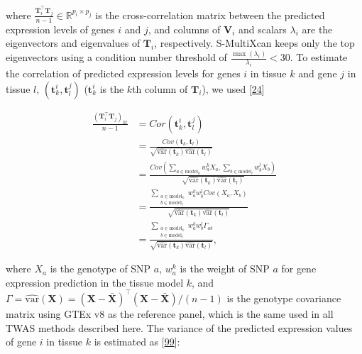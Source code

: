 \documentclass[
  legalpaperpaper,
]{article}
\begin{document}
where \(\frac{\mathbf{T}_{i}^{\top} \mathbf{T}_{j}}{n-1} \in \mathbb{R}^{p_i \times p_j}\) is the cross-correlation matrix between the predicted expression levels of genes \(i\) and \(j\),
and columns of \(\mathbf{V}_{i}\) and scalars \(\lambda_i\) are the eigenvectors and eigenvalues of \(\mathbf{T}_{i}\), respectively.
S-MultiXcan keeps only the top eigenvectors using a condition number threshold of \(\frac{\max(\lambda_i)}{\lambda_i} < 30\).
To estimate the correlation of predicted expression levels for genes \(i\) in tissue \(k\) and gene \(j\) in tissue \(l\), \((\mathbf{t}_k^i, \mathbf{t}_l^j)\) (\(\mathbf{t}_k^i\) is the \(k\)th column of \(\mathbf{T}_{i}\)), we used {[}\protect\hyperlink{ref-1FFzCXo1s}{24}{]}

\begin{equation}
\begin{split}
\frac{(\mathbf{T}_{i}^{\top} \mathbf{T}_{j})_{kl}}{n-1} & = Cor(\mathbf{t}_k^i, \mathbf{t}_l^j) \\
  & = \frac{ Cov(\mathbf{t}_k, \mathbf{t}_l) } { \sqrt{\widehat{\mathrm{var}}(\mathbf{t}_k) \widehat{\mathrm{var}}(\mathbf{t}_l)} } \\
  & = \frac{ Cov(\sum_{a \in \mathrm{model}_k} w_a^k X_a, \sum_{b \in \mathrm{model}_l} w_b^l X_b) }  {\sqrt{\widehat{\mathrm{var}}(\mathbf{t}_k) \widehat{\mathrm{var}}(\mathbf{t}_l)} } \\
  & = \frac{ \sum_{\substack{a \in \mathrm{model}_k \\ b \in \mathrm{model}_l}} w_a^k w_b^l Cov(X_a, X_b)} {\sqrt{\widehat{\mathrm{var}}(\mathbf{t}_k) \widehat{\mathrm{var}}(\mathbf{t}_l)} } \\
  & = \frac{ \sum_{\substack{a \in \mathrm{model}_k \\ b \in \mathrm{model}_l}} w_a^k w_b^l \Gamma_{ab}} {\sqrt{\widehat{\mathrm{var}}(\mathbf{t}_k) \widehat{\mathrm{var}}(\mathbf{t}_l)} },
\end{split}
\label{eq:reg:corr_genes}\end{equation}

where \(X_a\) is the genotype of SNP \(a\),
\(w_a^k\) is the weight of SNP \(a\) for gene expression prediction in the tissue model \(k\),
and \(\Gamma = \widehat{\mathrm{var}}(\mathbf{X}) = (\mathbf{X} - \bar{\mathbf{X}})^{\top} (\mathbf{X} - \bar{\mathbf{X}}) / (n-1)\) is the genotype covariance matrix using GTEx v8 as the reference panel, which is the same used in all TWAS methods described here.
The variance of the predicted expression values of gene \(i\) in tissue \(k\) is estimated as {[}\protect\hyperlink{ref-vLyTudUB}{99}{]}:
\end{document}
